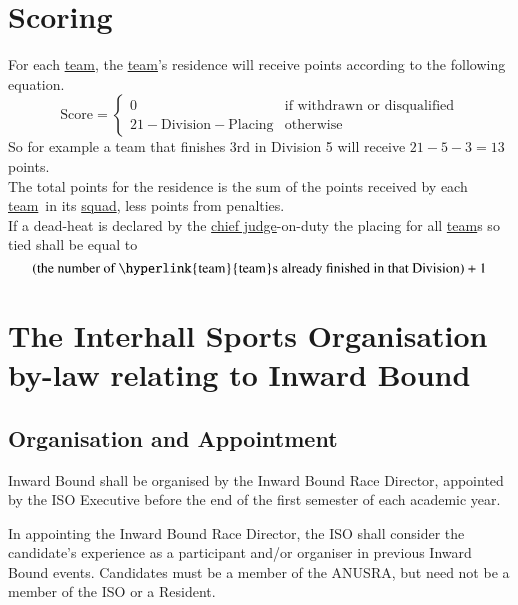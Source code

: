 \documentclass[12pt]{report}
\newcommand{\hyplink}[1]{\hyperlink{#1}{{#1}}}
\newcommand{\chiefjudge}{\hyplink{chief judge}}
\newcommand{\squad}{\hyplink{squad}}
\newcommand{\team}{\hyplink{team}}
\begin{document}
  \chapter{Scoring}\label{appendix:scoring}
  For each \team, the \team's residence will receive points according to the following equation.
  \[\text{Score} = \begin{cases}0 &\text{if withdrawn or disqualified} \\ 21 - \text{Division} - \text{Placing} &\text{otherwise} \end{cases}\]
  So for example a team that finishes 3rd in Division 5 will receive $21-5-3=13$ points. \\[12pt]
  The total points for the residence is the sum of the points received by each \team\ in its \squad, less points from penalties.\\[12pt]
  If a dead-heat is declared by the \chiefjudge-on-duty the placing for all \team s so tied shall be equal to
  \[(\text{the number of \team s already finished in that Division})+1\]
  \chapter{The Interhall Sports Organisation by-law relating to Inward Bound}

\section{Organisation and Appointment}
Inward Bound shall be organised by the Inward Bound Race Director, appointed
by the ISO Executive before the end of the first semester of each academic year.

In appointing the Inward Bound Race Director, the ISO shall consider the
candidate's experience as a participant and/or organiser in previous Inward Bound
events. Candidates must be a member of the ANUSRA, but need not be a member
of the ISO or a Resident.
\end{document}
